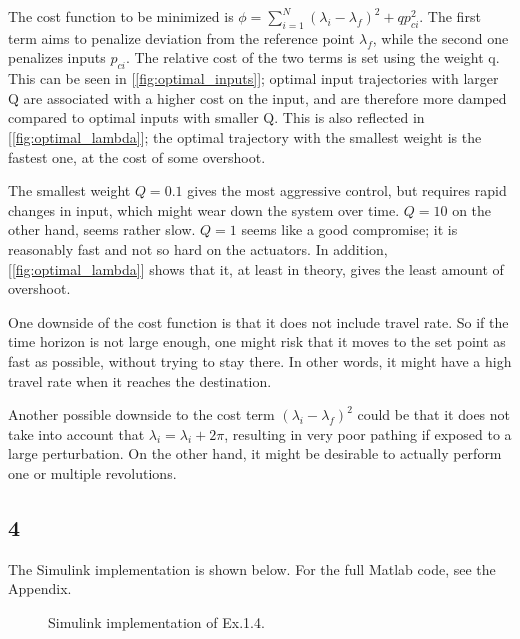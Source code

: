 The cost function to be minimized is $\phi = \sum_{i=1}^{N} (\lambda_i-\lambda_f)^2 + qp_{ci}^2$. The first term aims to penalize deviation from the reference point $\lambda_f$, while the second one penalizes inputs $p_{ci}$. The relative cost of the two terms is set using the weight q. This can be seen in [\ref{fig:optimal_inputs}]; optimal input trajectories with larger Q are associated with a higher cost on the input, and are therefore more damped compared to optimal inputs with smaller Q. This is also reflected in [\ref{fig:optimal_lambda}]; the optimal trajectory with the smallest weight is the fastest one, at the cost of some overshoot.

The smallest weight $Q=0.1$ gives the most aggressive control, but requires rapid changes in input, which might wear down the system over time. $Q=10$ on the other hand, seems rather slow. $Q=1$ seems like a good compromise; it is reasonably fast and not so hard on the actuators. In addition, [\ref{fig:optimal_lambda}] shows that it, at least in theory, gives the least amount of overshoot.

One downside of the cost function is that it does not include travel rate. So if the time horizon is not large enough, one might risk that it moves to the set point as fast as possible, without trying to stay there. In other words, it might have a high travel rate when it reaches the destination.

Another possible downside to the cost term $(\lambda_i - \lambda_f)^2$ could be that it does not take into account that $\lambda_i = \lambda_ i + 2\pi$, resulting in very poor pathing if exposed to a large perturbation. On the other hand, it might be desirable to actually perform one or multiple revolutions.
\clearpage

\subsection{4}
The Simulink implementation is shown below. For the full Matlab code, see the Appendix.
\begin{figure}[H]
    \centering
    \caption{Simulink implementation of Ex.1.4.}
    \label{fig:my_label}
\end{figure}

